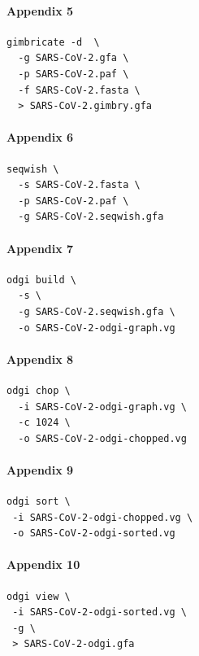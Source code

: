 \documentclass[10pt, a4paper]{article}
\begin{document}
\begin{appendices}
\paragraph{Appendix 5}
\label{sec:orgf68bf7f}
\begin{verbatim}
gimbricate -d  \
  -g SARS-CoV-2.gfa \
  -p SARS-CoV-2.paf \
  -f SARS-CoV-2.fasta \
  > SARS-CoV-2.gimbry.gfa

\end{verbatim}

\paragraph{Appendix 6}
\label{sec:orgc11ca39}
\begin{verbatim}
seqwish \
  -s SARS-CoV-2.fasta \
  -p SARS-CoV-2.paf \
  -g SARS-CoV-2.seqwish.gfa
\end{verbatim}


\paragraph{Appendix 7}
\label{sec:orgb51b29e}
\begin{verbatim}
odgi build \
  -s \
  -g SARS-CoV-2.seqwish.gfa \
  -o SARS-CoV-2-odgi-graph.vg
\end{verbatim}


\paragraph{Appendix 8}
\label{sec:org3260cdf}
\begin{verbatim}
odgi chop \
  -i SARS-CoV-2-odgi-graph.vg \
  -c 1024 \
  -o SARS-CoV-2-odgi-chopped.vg
\end{verbatim}

\paragraph{Appendix 9}
\label{sec:org31273ae}
\begin{verbatim}
odgi sort \
 -i SARS-CoV-2-odgi-chopped.vg \
 -o SARS-CoV-2-odgi-sorted.vg
\end{verbatim}

\paragraph{Appendix 10}
\label{sec:org4e39606}
\begin{verbatim}
odgi view \
 -i SARS-CoV-2-odgi-sorted.vg \
 -g \
 > SARS-CoV-2-odgi.gfa
\end{verbatim}


\end{appendices}
\end{document}
